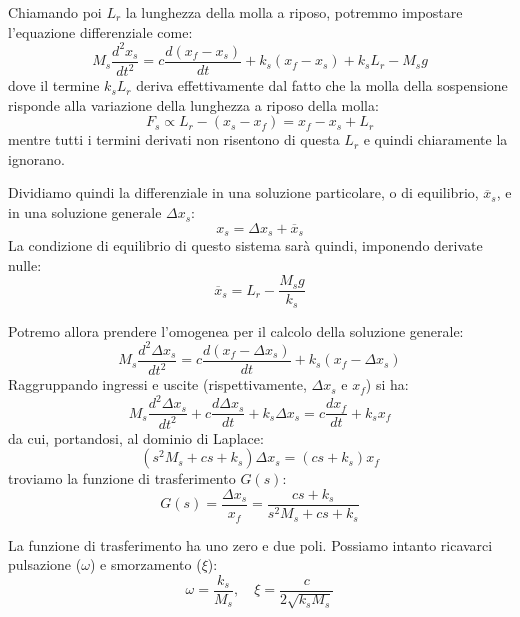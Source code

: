 \documentclass[a4paper,11pt]{article}
\begin{document}
Chiamando poi $L_r$ la lunghezza della molla a riposo, potremmo impostare l'equazione differenziale come:
$$
M_s \frac{d^2 x_s}{dt^2} = c \frac{d ( x_f - x_s )}{dt} + k_s (x_f - x_s) + k_s L_r - M_s g
$$
dove il termine $k_s L_r$ deriva effettivamente dal fatto che la molla della sospensione risponde alla variazione della lunghezza a riposo della molla:
$$
F_s \propto  L_r - (x_s - x_f) = x_f - x_s + L_r
$$
mentre tutti i termini derivati non risentono di questa $L_r$ e quindi chiaramente la ignorano.

Dividiamo quindi la differenziale in una soluzione particolare, o di equilibrio, $\overline{x}_s$, e in una soluzione generale $\Delta x_s$:
$$
x_s = \Delta x_s + \overline{x}_s
$$
La condizione di equilibrio di questo sistema sarà quindi, imponendo derivate nulle:
$$
\overline{x}_s = L_r - \frac{M_s g}{k_s}
$$

Potremo allora prendere l'omogenea per il calcolo della soluzione generale:
$$
M_s \frac{d^2 \Delta x_s}{dt^2} = c \frac{d ( x_f - \Delta x_s )}{dt} + k_s (x_f - \Delta x_s)
$$
Raggruppando ingressi e uscite (rispettivamente, $\Delta x_s$ e $x_f$) si ha:
$$
M_s \frac{d^2 \Delta x_s}{dt^2} + c \frac{d \Delta x_s}{dt} + k_s \Delta x_s = c \frac{dx_f}{dt} + k_s x_f
$$
da cui, portandosi, al dominio di Laplace:
$$
\left( s^2 M_s + cs + k_s \right) \Delta x_s = ( cs + k_s ) x_f
$$
troviamo la funzione di trasferimento $G(s)$:
$$
G(s) = \frac{\Delta x_s}{x_f} = \frac{c s + k_s}{s^2 M_s + c s + k_s}
$$

La funzione di trasferimento ha uno zero e due poli.
Possiamo intanto ricavarci pulsazione ($\omega$) e smorzamento ($\xi$):
$$
\omega = \frac{k_s}{M_s}, \quad \xi = \frac{c}{2 \sqrt{k_s M_s}}
$$
\end{document}

